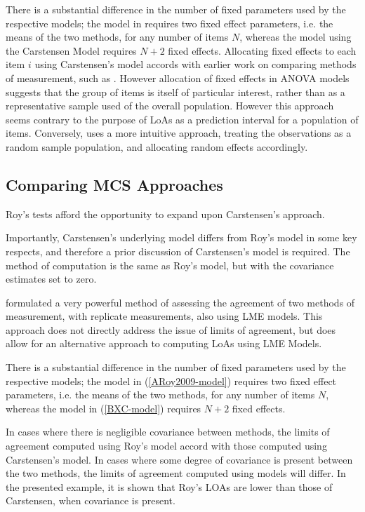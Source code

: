 \documentclass[12pt, a4paper]{report}
\theoremstyle{plain}
\theoremstyle{definition}
\theoremstyle{remark}
\begin{document}
	There is a substantial difference in the number of fixed parameters used by the respective models; the model in \citet{ARoy2009} requires two fixed effect parameters, i.e. the means of the two methods, for any number of items $N$, whereas the model using the Carstensen Model requires $N+2$ fixed effects. Allocating fixed effects to each item $i$ using Carstensen's model accords with earlier work on comparing methods of measurement, such as \citet{Grubbs48}. However allocation of fixed effects in ANOVA models suggests that the group of items is itself of particular interest, rather than as a representative sample used of the overall population. However this approach seems contrary to the purpose of LoAs as a prediction interval for a population of items. Conversely, \citet{ARoy2009}
	uses a more intuitive approach, treating the observations as a random sample population, and allocating random effects accordingly.
	
	\subsection{Comparing MCS Approaches}	
	Roy's tests afford the opportunity to expand upon Carstensen's approach. 
	
	Importantly, Carstensen's underlying model differs from Roy's model in some key respects, and therefore a prior discussion of Carstensen's model is required. The method of computation is the
	same as Roy's model, but with the covariance estimates set to zero.
	
	
	\citet{ARoy2009} formulated a very powerful method of assessing the agreement of two methods of measurement, with replicate measurements, also using LME models. This approach does not directly address the issue of limits of agreement, but does allow for an alternative approach to computing LoAs using LME Models. 
	
	There is a substantial difference in the number of fixed parameters used by the respective models; the model in (\ref{ARoy2009-model}) requires two fixed effect parameters, i.e. the means of the two methods, for any number of items $N$, whereas the model in (\ref{BXC-model}) requires $N+2$ fixed effects.
	
	
	In cases where there is negligible covariance between methods, the limits of agreement computed using Roy's model accord with those computed using Carstensen's model. In cases where some degree of
	covariance is present between the two methods, the limits of agreement computed using models will differ. In the presented
	example, it is shown that Roy's LOAs are lower than those of Carstensen, when covariance is present.
	
\end{document}
